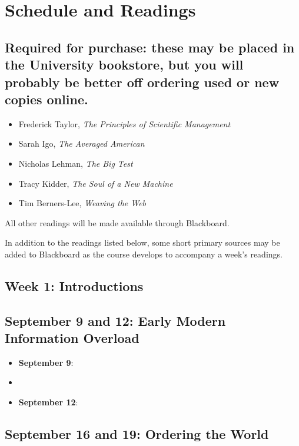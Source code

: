 \section{Schedule and Readings}

\subsection{Required for purchase: these may be placed in the University
bookstore, but you will probably be better off ordering used or new
copies online.}

\begin{itemize}
\item
  Frederick Taylor, \emph{The Principles of Scientific Management}
\item
  Sarah Igo, \emph{The Averaged American}
\item
  Nicholas Lehman, \emph{The Big Test}
\item
  Tracy Kidder, \emph{The Soul of a New Machine}
\item
  Tim Berners-Lee, \emph{Weaving the Web}
\end{itemize}

All other readings will be made available through Blackboard.

In addition to the readings listed below, some short primary sources may
be added to Blackboard as the course develops to accompany a week's
readings.

\subsection{Week 1: Introductions}

\subsection{September 9 and 12: Early Modern Information Overload}

\begin{itemize}
\item
  \textbf{September 9}: \cite{blair_reading_2003}
\item
  \cite{plato}
\item
  \textbf{September 12}: \cite{muller-wille_natural_2012}
\end{itemize}

\subsection{September 16 and 19: Ordering the World}

